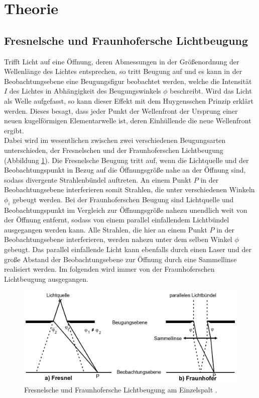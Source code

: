 
\section{Theorie}
\label{sec:Theorie}

\subsection{Fresnelsche und Fraunhofersche Lichtbeugung}

Trifft Licht auf eine Öffnung, deren Abmessungen in der Größenordnung der Wellenlänge des Lichtes entsprechen, so tritt Beugung auf und es kann in der Beobachtungsebene eine Beugungsfigur beobachtet werden, welche die Intensität $I$ des Lichtes in Abhängigkeit des Beugungswinkels $\phi$ beschreibt. 
Wird das Licht als Welle aufgefasst, so kann dieser Effekt mit dem Huygensschen Prinzip erklärt werden. Dieses besagt, dass jeder Punkt der Wellenfront der Ursprung einer neuen kugelförmigen Elementarwelle ist, deren Einhüllende die neue Wellenfront ergibt.\\
Dabei wird im wesentlichen zwischen zwei verschiedenen Beugungsarten unterschieden, der Fresnelschen  und der Fraunhoferschen Lichtbeugung (Abbildung \ref{fig:FFB}). Die Fresnelsche Beugung tritt auf, wenn die Lichtquelle und der Beobachtungspunkt in Bezug auf die Öffnungsgröße nahe an der Öffnung sind, sodass divergente Strahlenbündel auftreten. An einem Punkt $P$ in der Beobachtungsebene interferieren somit Strahlen, die unter verschiedenen Winkeln $\phi_i$ gebeugt werden. Bei der Fraunhoferschen Beugung sind Lichtquelle und Beobachtungspunkt im Vergleich zur Öffnungsgröße nahezu unendlich weit von der Öffnung entfernt, sodass von einem parallel einfallendem Lichtbündel ausgegangen werden kann. Alle Strahlen, die hier an einem Punkt $P$ in der Beobachtungsebene interferieren, werden nahezu unter dem selben Winkel $\phi$ gebeugt. Das parallel einfallende Licht kann ebenfalls durch einen Laser und der große Abstand der Beobachtungsebene zur Öffnung durch eine Sammellinse realisiert werden. Im folgenden wird immer von der Fraunhoferschen Lichtbeugung ausgegangen.

\begin{figure}
	\centering
	\includegraphics[width=\linewidth-70pt,height=\textheight-70pt,keepaspectratio]{content/images/FresnelFrauenhoferBeugung.png}
	\caption{Fresnelsche und Fraunhofersche Lichtbeugung am Einzelspalt \cite{V406}.}
	\label{fig:FFB}
\end{figure}

